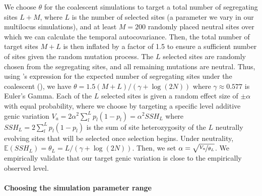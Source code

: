 \documentclass[11pt]{article}
\newcommand{\E}{\mathbb{E}}
\begin{document}
We choose $\theta$ for the coalescent simulations to target a total number of
segregating sites $L + M$, where $L$ is the number of selected sites (a
parameter we vary in our multilocus simulations), and at least $M=200$ randomly
placed neutral sites over which we can calculate the temporal autocovariance.
Then, the total number of target sites $M+L$ is then inflated by a factor of
1.5 to ensure a sufficient number of sites given the random mutation process.
The $L$ selected sites are randomly chosen from the segregating sites, and all
remaining mutations are neutral. Thus, using \citeauthor{Watterson1975-kt}'s
expression for the expected number of segregating sites under the coalescent
(\citeyear{Watterson1975-kt}), we have $\theta = 1.5(M+L) / (\gamma +
\log(2N))$ where $\gamma \approx 0.577$ is Euler's Gamma. Each of the $L$
selected sites is given a random effect size of $\pm \alpha$ with equal
probability, where we choose by targeting a specific level additive genic
variation $V_a = 2 \alpha^2 \sum_l^L p_l(1-p_l) = \alpha^2 SSH_L$ where $SSH_L
= 2 \sum_l^L p_l(1-p_l)$ is the sum of site heterozygosity of the $L$ neutrally
evolving sites that will be selected once selection begins. Under neutrality,
$\E(SSH_L) = \theta_L = L/(\gamma + \log(2N))$. Then, we set $\alpha =
\sqrt{\nicefrac{V_a}{\theta_L}}$. We empirically validate that our target genic
variation is close to the empirically observed level.

\paragraph{Choosing the simulation parameter range}
\label{sec:supp-ml-sim-param}
\end{document}
